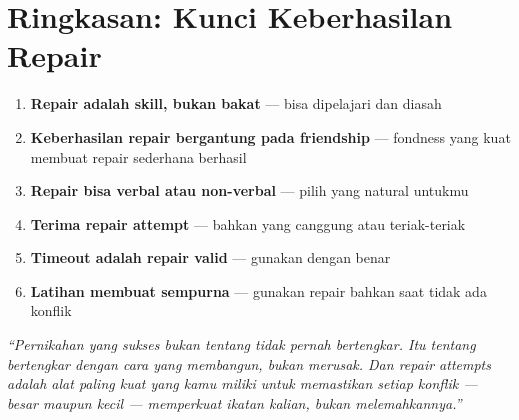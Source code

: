 \section{Ringkasan: Kunci Keberhasilan Repair}

\begin{praktikbox}
\begin{enumerate}
    \item \textbf{Repair adalah skill, bukan bakat} --- bisa dipelajari dan diasah
    \item \textbf{Keberhasilan repair bergantung pada friendship} --- fondness yang kuat membuat repair sederhana berhasil
    \item \textbf{Repair bisa verbal atau non-verbal} --- pilih yang natural untukmu
    \item \textbf{Terima repair attempt} --- bahkan yang canggung atau teriak-teriak
    \item \textbf{Timeout adalah repair valid} --- gunakan dengan benar
    \item \textbf{Latihan membuat sempurna} --- gunakan repair bahkan saat tidak ada konflik
\end{enumerate}
\end{praktikbox}

\begin{insightbox}
\textit{``Pernikahan yang sukses bukan tentang tidak pernah bertengkar. Itu tentang bertengkar dengan cara yang membangun, bukan merusak. Dan repair attempts adalah alat paling kuat yang kamu miliki untuk memastikan setiap konflik --- besar maupun kecil --- memperkuat ikatan kalian, bukan melemahkannya.''}
\end{insightbox}
